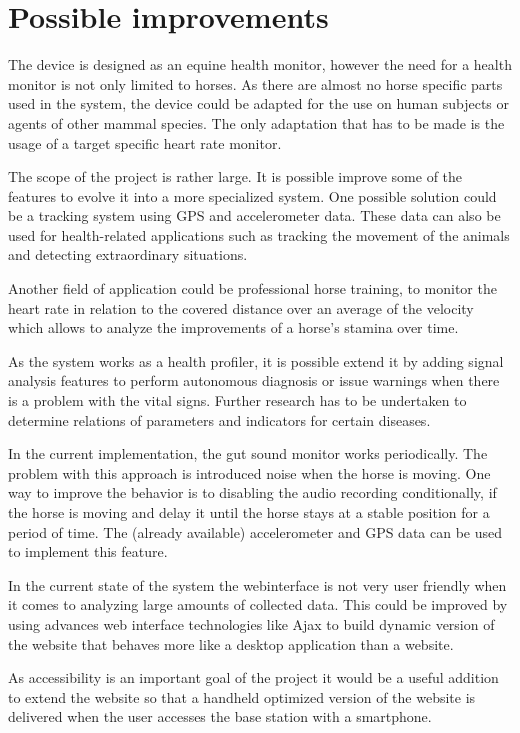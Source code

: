 \section{Possible improvements}
The device is designed as an equine health monitor, however the need for a health monitor is not only limited to horses. As there are almost no horse specific parts used in the system, the device could be adapted for the use on human subjects or agents of other mammal species. The only adaptation that has to be made is the usage of a target specific heart rate monitor. 

The scope of the project is rather large. It is possible improve some of the features to evolve it into a more specialized system. One possible solution could be a tracking system using GPS and accelerometer data. These data can also be used for health-related applications such as tracking the movement of the animals and detecting extraordinary situations. 

Another field of application could be professional horse training, to monitor the heart rate in relation to the covered distance over an average of the velocity which allows to analyze the improvements of a horse’s stamina over time.

As the system works as a health profiler, it is possible extend it by adding signal analysis features to perform autonomous diagnosis or issue warnings when there is a problem with the vital signs. Further research has to be undertaken to determine relations of parameters and indicators for certain diseases.

In the current implementation, the gut sound monitor works periodically. The problem with this approach is introduced noise when the horse is moving. One way to improve the behavior is to disabling the audio recording conditionally, if the horse is moving and delay it until the horse stays at a stable position for a period of time. The (already available) accelerometer and GPS data can be used to implement this feature.

In the current state of the system the webinterface is not very user friendly when it comes to analyzing large amounts of collected data. This could be improved by using advances web interface technologies like Ajax to build dynamic version of the website that behaves more like a desktop application than a website.

As accessibility is an important goal of the project it would be a useful addition to extend the website so that a handheld optimized version of the website is delivered when the user accesses the base station with a smartphone.

